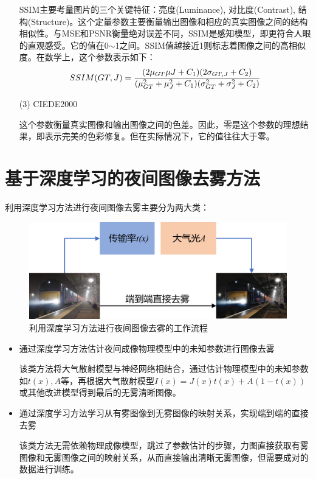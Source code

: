 \begin{multicols}{2}
\begin{enumerate}
	SSIM主要考量图片的三个关键特征：亮度(Luminance), 对比度(Contrast), 结构(Structure)。这个定量参数主要衡量输出图像和相应的真实图像之间的结构相似性。与MSE和PSNR衡量绝对误差不同，SSIM是感知模型，即更符合人眼的直观感受。它的值在0$\sim$1之间。SSIM值越接近1则标志着图像之间的高相似度。在数学上，这个参数表示如下：
	\begin{equation}
		\footnotesize{
		SSIM(GT,J)=\frac{(2\mu_{GT}\mu{J}+C_1)(2\sigma_{GT,J}+C_2)}{(\mu_{GT}^2+\mu_J^2+C_1)(\sigma_{GT}^2+\sigma_J^2+C_2)}}
	\end{equation}
	\item[(3)] CIEDE2000\cite{16}
	
	这个参数衡量真实图像和输出图像之间的色差。因此，零是这个参数的理想结果，即表示完美的色彩修复。但在实际情况下，它的值往往大于零。
	
\end{enumerate}
\section{基于深度学习的夜间图像去雾方法}
利用深度学习方法进行夜间图像去雾主要分为两大类：
\begin{figure}[H]
	\centering
	\includegraphics[width=1.0\linewidth]{pics/screenshot011}
	\caption{利用深度学习方法进行夜间图像去雾的工作流程}
	\label{fig:screenshot011}
\end{figure}

\begin{itemize}
	\item 通过深度学习方法估计夜间成像物理模型中的未知参数进行图像去雾
	
	该类方法将大气散射模型与神经网络相结合，通过估计物理模型中的未知参数如$t(x),A$等，再根据大气散射模型$I(x)=J(x)t(x)+A(1-t(x))$或其他改进模型得到最后的无雾清晰图像。
	\item 通过深度学习方法学习从有雾图像到无雾图像的映射关系，实现端到端的直接去雾
	
	该类方法无需依赖物理成像模型，跳过了参数估计的步骤，力图直接获取有雾图像和无雾图像之间的映射关系，从而直接输出清晰无雾图像，但需要成对的数据进行训练。
\end{itemize}


\end{multicols}
